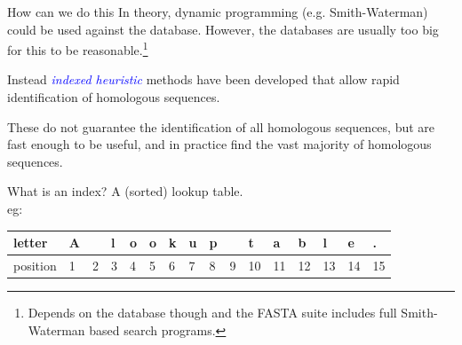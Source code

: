 \documentclass[pdf]{beamer}
\begin{document}
\begin{frame}{How can we do this}
  In theory, dynamic programming (e.g. Smith-Waterman) could be used against
  the database. However, the databases are usually too big for this to be
  reasonable.\footnote{Depends on the database though and the FASTA
    suite includes full Smith-Waterman based search programs.}

  Instead \textcolor{blue}{\emph{indexed heuristic}} methods have been
  developed that allow rapid identification of homologous sequences.

  These do not guarantee the identification of all homologous sequences, but
  are fast enough to be useful, and in practice find the vast majority of
  homologous sequences.
\end{frame}

\begin{frame}{What is an index?}
  A (sorted) lookup table.\\

  eg:

  {%
    \tiny
    \setlength{\tabcolsep}{0.5em}    
    \begin{tabular}{ l*{15}{|l} }
      letter & A &  & l & o & o & k & u & p & & t & a & b & l & e & . \\
      \hline
      position & 1 & 2 & 3 & 4 & 5 & 6 & 7 & 8 & 9 & 10 & 11 & 12 & 13 & 14 & 15 \\
    \end{tabular}
  }

\end{frame}
\end{document}
